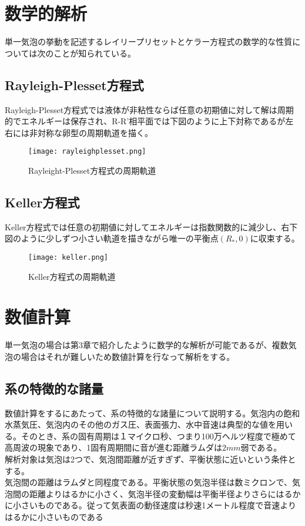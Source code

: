 \documentclass[11pt,a4j]{jreport}
\begin{document}

\chapter{数学的解析}
単一気泡の挙動を記述するレイリープリセットとケラー方程式の数学的な性質については次のことが知られている。
%
\section{Rayleigh-Plesset方程式}
Rayleigh-Plesset方程式では液体が非粘性ならば任意の初期値に対して解は周期的でエネルギーは保存され、R-R’相平面では下図のように上下対称であるが左右には非対称な卵型の周期軌道を描く。
\begin{figure}[tbh]
\centering
\texttt{[image: rayleighplesset.png]}
\caption{Rayleight-Plesset方程式の周期軌道}
\label{fig:rayleighplesset}
\end{figure}
%
\section{Keller方程式}
Keller方程式では任意の初期値に対してエネルギーは指数関数的に減少し、右下図のように少しずつ小さい軌道を描きながら唯一の平衡点$(R_{*}, 0)$に収束する。
\begin{figure}[tbh]
\centering
\texttt{[image: keller.png]}
\caption{Keller方程式の周期軌道}
\label{fig:keller}
\end{figure}


\chapter{数値計算}
単一気泡の場合は第3章で紹介したように数学的な解析が可能であるが、複数気泡の場合はそれが難しいため数値計算を行なって解析をする。
%
\section{系の特徴的な諸量}
数値計算をするにあたって、系の特徴的な諸量について説明する。気泡内の飽和水蒸気圧、気泡内のその他のガス圧、表面張力、水中音速は典型的な値を用いる。そのとき、系の固有周期は１マイクロ秒、つまり100万ヘルツ程度で極めて高周波の現象であり、1固有周期間に音が進む距離ラムダは$2mm$弱である。\\
解析対象は気泡は2つで、気泡間距離が近すぎず、平衡状態に近いという条件とする。 \\
気泡間の距離はラムダと同程度である。平衡状態の気泡半径は数ミクロンで、気泡間の距離よりはるかに小さく、気泡半径の変動幅は平衡半径よりさらにはるかに小さいものである。従って気表面の動径速度は秒速1メートル程度で音速よりはるかに小さいものである
\end{document}
